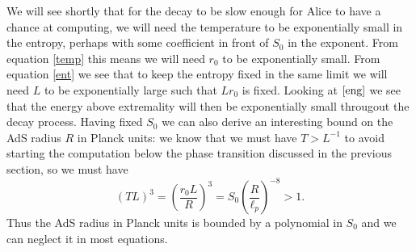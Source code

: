\documentclass[12pt]{article}
\newcommand{\be}{\begin{equation}}
\newcommand{\ee}{\end{equation}}
\begin{document}
We will see shortly that for the decay to be slow enough for Alice to have a chance at computing, we will need the temperature to be exponentially small in the entropy, perhaps with some coefficient in front of $S_0$ in the exponent.  From equation \eqref{temp} this means we will need $r_0$ to be exponentially small.  From equation \eqref{ent} we see that to keep the entropy fixed in the same limit we will need $L$ to be exponentially large such that $Lr_0$ is fixed. Looking at $\eqref{eng}$ we see that the energy above extremality will then be exponentially small througout the decay process.  Having fixed $S_0$ we can also derive an interesting bound on the AdS radius $R$ in Planck units: we know that we must have $T>L^{-1}$ to avoid starting the computation below the phase transition discussed in the previous section, so we must have
\be
(TL)^3=\left(\frac{r_0L}{R}\right)^3=S_0\left(\frac{R}{\ell_p}\right)^{-8}>1.
\ee
Thus the AdS radius in Planck units is bounded by a polynomial in $S_0$ and we can neglect it in most equations. 
\end{document}
